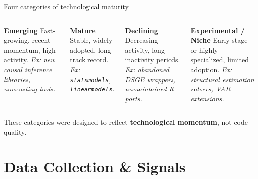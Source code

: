 
\begin{frame}{Four categories of technological maturity}

  \begin{columns}

    \begin{block}{\textcolor{emerging}{\textbf{Emerging}}}
      Fast-growing, recent momentum, high activity.
      \textit{Ex: new causal inference libraries, nowcasting tools.}
    \end{block}

    \vspace{0.4em}

    \begin{block}{\textcolor{mature}{\textbf{Mature}}}
      Stable, widely adopted, long track record.
      \textit{Ex: \texttt{statsmodels}, \texttt{linearmodels}.}
    \end{block}


    \begin{block}{\textcolor{declining}{\textbf{Declining}}}
      Decreasing activity, long inactivity periods.
      \textit{Ex: abandoned DSGE wrappers, unmaintained R ports.}
    \end{block}

    \vspace{0.4em}

    \begin{block}{\textcolor{experimental}{\textbf{Experimental / Niche}}}
      Early-stage or highly specialized, limited adoption.
      \textit{Ex: structural estimation solvers, VAR extensions.}
    \end{block}

  \end{columns}

  \bigskip
  \small These categories were designed to reflect \textbf{technological momentum},
  not code quality.

\end{frame}

\section{Data Collection \& Signals}

